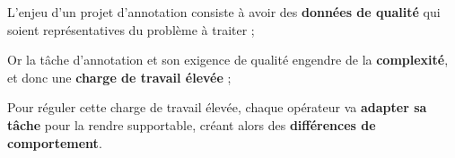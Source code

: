 	
	\begin{leftBarSummary}
		\begin{todolist}
			\item[\itemok] L'enjeu d'un projet d'annotation consiste à avoir des \textbf{données de qualité} qui soient représentatives du problème à traiter ;
			\item[\itemok] Or la tâche d'annotation et son exigence de qualité engendre de la \textbf{complexité}, et donc une \textbf{charge de travail élevée} ;
			\item[\itemok] Pour réguler cette charge de travail élevée, chaque opérateur va \textbf{adapter sa tâche} pour la rendre supportable, créant alors des \textbf{différences de comportement}.
		\end{todolist}
	\end{leftBarSummary}